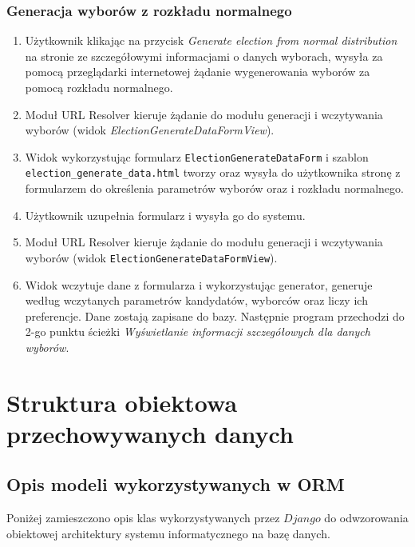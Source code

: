 \documentclass[pdflatex,11pt]{../aghdoc_version2}
\newcommand{\code}[1]{\texttt{#1}}
\begin{document}
\subsection{Generacja wyborów z rozkładu normalnego}
\begin{enumerate}
\item Użytkownik klikając na przycisk \textit{Generate election from normal distribution} na stronie
ze szczegółowymi informacjami o danych wyborach, wysyła za pomocą przeglądarki
internetowej żądanie wygenerowania wyborów za pomocą rozkładu normalnego.
\item Moduł URL Resolver kieruje żądanie do modułu generacji i wczytywania wyborów (widok
\textit{ElectionGenerateDataFormView}).
\item Widok wykorzystując formularz \code{ElectionGenerateDataForm} i szablon
\code{election\_generate\_data.html} tworzy oraz wysyła do użytkownika stronę z formularzem do
określenia parametrów wyborów oraz i rozkładu normalnego.
\item Użytkownik uzupełnia formularz i wysyła go do systemu.
\item Moduł URL Resolver kieruje żądanie do modułu generacji i wczytywania wyborów (widok
\code{ElectionGenerateDataFormView}).
\clearpage
\item Widok wczytuje dane z formularza i wykorzystując generator, generuje według
wczytanych parametrów kandydatów, wyborców oraz liczy ich preferencje. Dane
zostają zapisane do bazy. Następnie program przechodzi do 2-go punktu ścieżki
\textit{Wyświetlanie informacji szczegółowych dla danych wyborów}.
\end{enumerate}

\chapter{Struktura obiektowa przechowywanych danych}
\section{Opis modeli wykorzystywanych w ORM}
Poniżej zamieszczono opis klas wykorzystywanych przez $Django$ do odwzorowania
obiektowej architektury systemu informatycznego na bazę danych.
\end{document}
